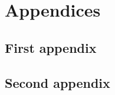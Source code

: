\newpage
{}


\newpage

\appendix
\section*{Appendices}
\renewcommand{\thesubsection}{\Alph{subsection}}
\subsection{First appendix}
\subsection{Second appendix}


